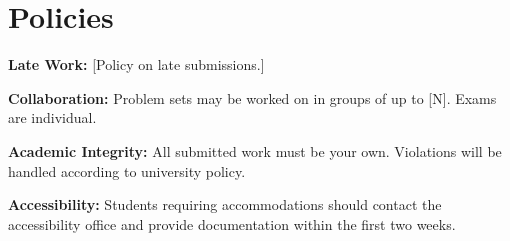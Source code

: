 \documentclass[11pt]{article}
\begin{document}
\section*{Policies}

\textbf{Late Work:} [Policy on late submissions.]

\textbf{Collaboration:} Problem sets may be worked on in groups of up to [N]. Exams are individual.

\textbf{Academic Integrity:} All submitted work must be your own. Violations will be handled according to university policy.

\textbf{Accessibility:} Students requiring accommodations should contact the accessibility office and provide documentation within the first two weeks.
\end{document}
